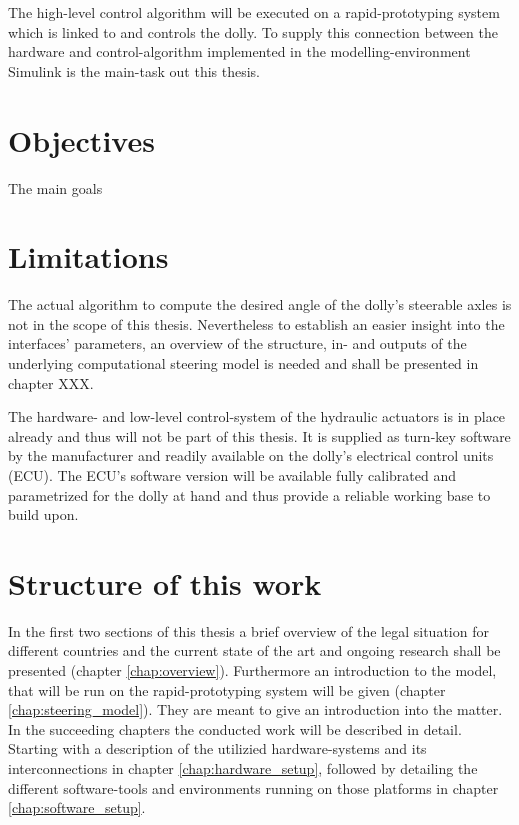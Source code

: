 \documentclass[ExampleMasters.tex]{subfiles}
\begin{document}
The high-level control algorithm will be executed on a rapid-prototyping system which is linked to and controls the dolly. To supply this connection between the hardware and control-algorithm implemented in the modelling-environment Simulink is the main-task out this thesis.   

\section{Objectives}
\label{sec:objectives}
The main goals

\section{Limitations}
\label{sec:limitations}
The actual algorithm to compute the desired angle of the dolly's steerable axles is not in the scope of this thesis. Nevertheless to establish an easier insight into the interfaces' parameters, an overview of the structure, in- and outputs of the underlying computational steering model is needed and shall be presented in chapter XXX. 

The hardware- and low-level control-system of the hydraulic actuators is in place already and thus will not be part of this thesis. It is supplied as turn-key software by the manufacturer and readily available on the dolly's electrical control units (ECU). The ECU's software version will be available fully calibrated and parametrized for the dolly at hand and thus provide a reliable working base to build upon. 


\section{Structure of this work}
\label{sec:structure}

In the first two sections of this thesis a brief overview of the legal situation for different countries and the current state of the art and ongoing research shall be presented (chapter \ref{chap:overview}). Furthermore an introduction to the model, that will be run on the rapid-prototyping system will be given (chapter \ref{chap:steering_model}). They are meant to give an introduction into the matter. In the succeeding chapters the conducted work will be described in detail. Starting with a description of the utilizied hardware-systems and its interconnections in chapter \ref{chap:hardware_setup}, followed by detailing the different software-tools and environments running on those platforms in chapter \ref{chap:software_setup}.
\end{document}
